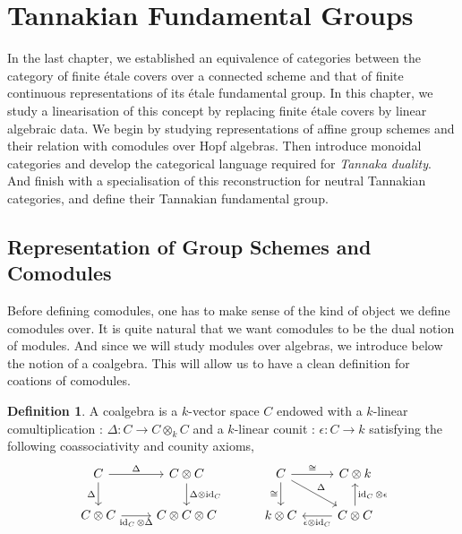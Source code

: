 \documentclass{article}
\theoremstyle{plain}
\theoremstyle{definition}
\newtheorem{definition}[theorem]{Definition}
\DeclareMathOperator{\id}{id}
\begin{document}
\section{Tannakian Fundamental Groups}

In the last chapter, we established an equivalence of categories between the category of finite \'etale covers over a connected scheme and that of finite continuous representations of its \'etale fundamental group. 
In this chapter, we study a linearisation of this concept by replacing finite \'etale covers by linear algebraic data. 
We begin by studying representations of affine group schemes and their relation with comodules over Hopf algebras. 
Then introduce monoidal categories and develop the categorical language required for \textit{Tannaka duality}.
And finish with a specialisation of this reconstruction for neutral Tannakian categories, and define their Tannakian fundamental group.



\subsection{Representation of Group Schemes and Comodules}

Before defining comodules, one has to make sense of the kind of object we define comodules over. 
It is quite natural that we want comodules to be the dual notion of modules. 
And since we will study modules over algebras, we introduce below the notion of a coalgebra.
This will allow us to have a clean definition for coations of comodules.


\begin{definition}
    A coalgebra is a $k$-vector space $C$ endowed with a $k$-linear comultiplication : $\Delta:C\rightarrow C\otimes_k C$ and a $k$-linear counit : $\epsilon : C\rightarrow k$ satisfying the following coassociativity and counity axioms,
    \[
    \begin{tikzcd}
        C \arrow[r,"\Delta"] \arrow[d, "\Delta"'] & C \otimes C \arrow[d,"\Delta \otimes \id_C"] \\
        C \otimes C \arrow[r,"\id_C \otimes \Delta"'] & C \otimes C\otimes C
    \end{tikzcd}
    \hspace{1cm}
    \begin{tikzcd}
        C \arrow[rd, "\Delta"]
        \arrow[d, "\cong"']
        \arrow[r, "\cong"] &
        C \otimes k  \\
         k\otimes C &  
         C \otimes C
         \arrow[u,"\id_C\otimes \epsilon"']
         \arrow[l, "\epsilon\otimes \id_C"]
    \end{tikzcd}
    \]
    
\end{definition}
\end{document}
